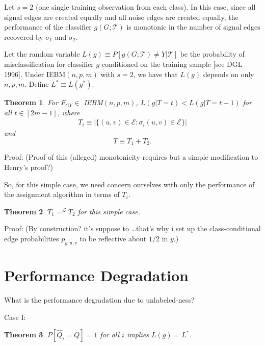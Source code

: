 \documentclass{article}
\newcommand{\mcE}{\mathcal{E}}
\newcommand{\mcT}{\mathcal{T}}
\newcommand{\mcL}{\mathcal{L}}
\newcommand{\hatp}{\widehat{p}}
\newcommand{\hatQ}{\widehat{Q}}
\newtheorem{thm}{Theorem}
\newcommand{\thma}{\begin{thm}}
\newcommand{\thmb}{\end{thm}}
\begin{document}
Let $s=2$ (one single training observation from each class).
In this case, since all signal edges are created equally and all noise edges are created equally,
the performance of the classifier $g(G;\mcT)$
is monotonic in the number of signal edges recovered by $\sigma_1$ and $\sigma_2$.


Let the random variable $L(g) \equiv P[g(G;\mcT) \neq Y| \mcT]$
be the probability of misclassification for classifier $g$
conditioned on the training sample [see DGL 1996].
Under IEBM$(n,p,m)$ with $s=2$, we have that $L(g)$ depends on only $n,p,m$.
Define $L^* \equiv L(g^*)$.

\thma
For $F_{GY} \in$ IEBM$(n,p,m)$,
$L(g|T=t) < L(g|T=t-1)$ for all $t \in [2m-1]$,
where
\begin{eqnarray}
T_i \equiv |\{(u,v) \in \mcE: \sigma_i(u,v) \in \mcE\}|
\end{eqnarray}
and
$$T \equiv T_1 + T_2.$$
\thmb

Proof:
(Proof of this (alleged) monotonicity requires but a simple modification to Henry's proof?)

So, for this simple case,
we need concern ourselves with only the performance of the assignment algorithm in terms of $T_i$.

\thma
$T_1 =^{\mcL} T_2$ for this simple case.
\thmb

Proof:
(By construction? it's suppose to \dots that's why i set up the class-conditional edge probabilities
 $p_{y;u,v}$ to be reflective about $1/2$ in $y$.)




\section{Performance Degradation}

What is the performance degradation due to unlabeled-ness?

Case I:

\thma
$P[\hatQ_i = Q]=1$ for all $i$ implies $L(g)=L^*$.
\thmb
\end{document}
